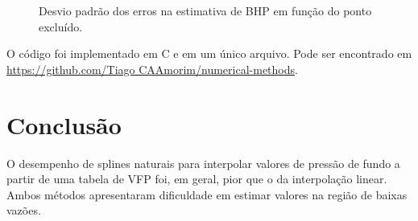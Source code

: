 \documentclass[final,5p]{elsarticle}
\numberwithin{equation}{section}
\begin{document}
        \begin{figure}[hbt!] 
            \caption{Desvio padrão dos erros na estimativa de BHP em função do ponto excluído.}
            \label{fig:desvpadvfp}
        \end{figure}
        

        O código foi implementado em C e em um único arquivo. Pode ser encontrado em \href{https://github.com/TiagoCAAmorim/numerical-methods/blob/main/04_Splines/04_splines.c}{https://github.com/Tiago CAAmorim/numerical-methods}.

    \section{Conclusão}
    
        O desempenho de splines naturais para interpolar valores de pressão de fundo a partir de uma tabela de VFP foi, em geral, pior que o da interpolação linear. Ambos métodos apresentaram dificuldade em estimar valores na região de baixas vazões.

    

\appendix

\end{document}
